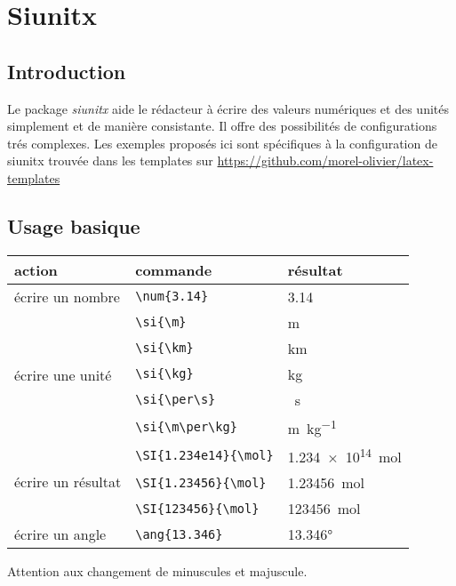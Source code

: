 \section{Siunitx}
\subsection{Introduction}
Le package \emph{siunitx} aide le rédacteur à écrire des valeurs numériques et des unités simplement et de manière consistante.
Il offre des possibilités de configurations trés complexes.
Les exemples proposés ici sont spécifiques à la configuration de siunitx trouvée dans les templates sur \url{https://github.com/morel-olivier/latex-templates}

\subsection{Usage basique}
\begin{tabularx}{0.8\textwidth}{ l l l }
	\hline
	action	& commande	& résultat	\\
	\hline
	écrire un nombre	& \verb|\num{3.14}|	& \num{3.14}	\\
	\hline
	\multirow{5}{40mm}{écrire une unité}	& \verb|\si{\m}|		& \si{\m}\\
											& \verb|\si{\km}|		& \si{\km}\\
											& \verb|\si{\kg}|		& \si{\kg}\\
											& \verb|\si{\per\s}|	& \si{\per\s}\\
											& \verb|\si{\m\per\kg}|	& \si{\m\per\kg}\\
	\hline
	\multirow{3}{40mm}{écrire un résultat}	& \verb|\SI{1.234e14}{\mol}|		& \SI{1.234e14}{\mol}\\
											& \verb|\SI{1.23456}{\mol}|		& \SI{1.23456}{\mol}\\
											& \verb|\SI{123456}{\mol}|		& \SI{123456}{\mol}\\
	\hline
	écrire un angle		& \verb|\ang{13.346}|	& \ang{13.346}\\
	\hline
\end{tabularx}

Attention aux changement de minuscules et majuscule.
